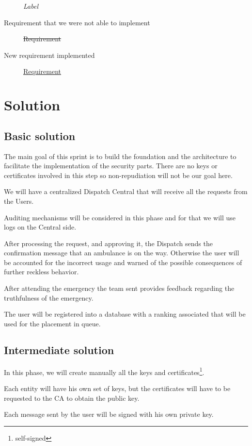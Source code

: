 \documentclass[a4paper,titlepage,11pt]{article}
\begin{document}
\begin{description}
  \item [] \textit{Label}
  \item [Requirement that we were not able to implement] \st{Requirement}
  \item [New requirement implemented] \underline{Requirement}
\end{description}

\newpage

\section{Solution}
\subsection{Basic solution}
The main goal of this sprint is to build the foundation and the architecture to facilitate the implementation
of the security parts. There are no keys or certificates involved in this step so non-repudiation will not be
our goal here.

We will have a centralized Dispatch Central that will receive all the requests from the Users.

Auditing mechanisms will be considered in this phase and for that we will use logs on the Central side.

After processing the request, and approving it, the Dispatch sends the confirmation message that an ambulance is
on the way. Otherwise the user will be accounted for the incorrect usage and warned of the possible consequences
of further reckless behavior.

After attending the emergency the team sent provides feedback regarding the truthfulness of the emergency.

The user will be registered into a database with a ranking associated that will be used for the placement in queue.

\subsection{Intermediate solution}
In this phase, we will create manually all the keys and certificates\footnote{self-signed}.

Each entity will have his own set of keys, but the certificates will have to be requested to the CA to obtain
the public key.

Each message sent by the user will be signed with his own private key.
\end{document}

